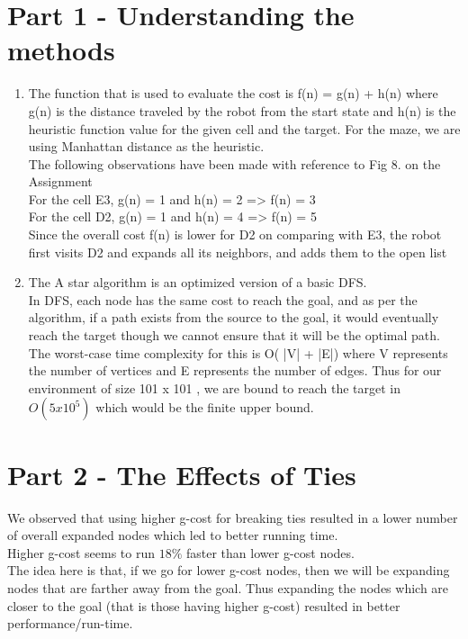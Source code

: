 \documentclass{article}
\begin{document}
\section*{Part 1 - Understanding the methods}
\begin{enumerate}
\item 
\begin{flushleft}
The function that is used to evaluate the cost is f(n) = g(n) + h(n) where g(n) is the distance traveled by the robot from the start state and h(n) is the heuristic function value for the given cell and the target. For the maze, we are using Manhattan distance as the heuristic. \\
The following observations have been made with reference to Fig 8. on the Assignment \\
For the cell E3,  g(n) = 1 and h(n) = 2 => f(n) = 3 \\
For the cell D2, g(n) = 1 and h(n) = 4  => f(n) = 5 \\
Since the overall cost f(n) is lower for D2 on comparing with E3, the robot first visits D2 and expands all its neighbors, and adds them to the open list
\end{flushleft}
\item
\begin{flushleft}
The A star algorithm is an optimized version of a basic DFS. \\
In DFS, each node has the same cost to reach the goal, and as per the algorithm, if a path exists from the source to the goal, it would eventually reach the target though we cannot ensure that it will be the optimal path. The worst-case time complexity for this is O( |V| + |E|) where V represents the number of vertices and E represents the number of edges. Thus for our environment of size 101 x 101 , we are bound to reach the target in $O(5x10^5)$ which would be the finite upper bound.
\end{flushleft}
\end{enumerate}
\newpage

\section*{Part 2 - The Effects of Ties}
\begin{flushleft}
We observed that using higher g-cost for breaking ties resulted in a lower number of overall expanded nodes which led to better running time. \\
Higher g-cost seems to run $18\%$ faster than lower g-cost nodes. \\
The idea here is that, if we go for lower g-cost  nodes, then we will be expanding nodes that are farther away from the goal. Thus expanding the nodes which are closer to the goal (that is those having higher g-cost) resulted in better performance/run-time.
\end{flushleft}
\end{document}
